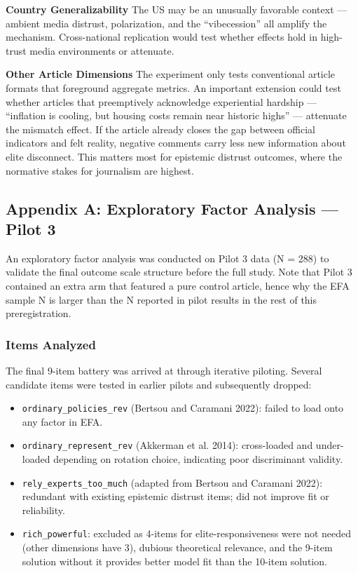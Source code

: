 \documentclass[
  12pt]{article}
\providecommand{\tightlist}{%
  \setlength{\itemsep}{0pt}\setlength{\parskip}{0pt}}
\begin{document}
\textbf{Country Generalizability} The US may be an unusually favorable
context --- ambient media distrust, polarization, and the
``vibecession'' all amplify the mechanism. Cross-national replication
would test whether effects hold in high-trust media environments or
attenuate.

\textbf{Other Article Dimensions} The experiment only tests conventional
article formats that foreground aggregate metrics. An important
extension could test whether articles that preemptively acknowledge
experiential hardship --- ``inflation is cooling, but housing costs
remain near historic highs'' --- attenuate the mismatch effect. If the
article already closes the gap between official indicators and felt
reality, negative comments carry less new information about elite
disconnect. This matters most for epistemic distrust outcomes, where the
normative stakes for journalism are highest.

\newpage

\subsection{Appendix A: Exploratory Factor Analysis --- Pilot
3}\label{appendix-a-exploratory-factor-analysis-pilot-3}

An exploratory factor analysis was conducted on Pilot 3 data (N = 288)
to validate the final outcome scale structure before the full study.
Note that Pilot 3 contained an extra arm that featured a pure control
article, hence why the EFA sample N is larger than the N reported in
pilot results in the rest of this preregistration.

\subsubsection{Items Analyzed}\label{items-analyzed}

The final 9-item battery was arrived at through iterative piloting.
Several candidate items were tested in earlier pilots and subsequently
dropped:

\begin{itemize}
\tightlist
\item
  \texttt{ordinary\_policies\_rev} (Bertsou and Caramani 2022): failed
  to load onto any factor in EFA.
\item
  \texttt{ordinary\_represent\_rev} (Akkerman et al. 2014): cross-loaded
  and under-loaded depending on rotation choice, indicating poor
  discriminant validity.
\item
  \texttt{rely\_experts\_too\_much} (adapted from Bertsou and Caramani
  2022): redundant with existing epistemic distrust items; did not
  improve fit or reliability.
\item
  \texttt{rich\_powerful}: excluded as 4-items for elite-responsiveness
  were not needed (other dimensions have 3), dubious theoretical
  relevance, and the 9-item solution without it provides better model
  fit than the 10-item solution.
\end{itemize}
\end{document}
